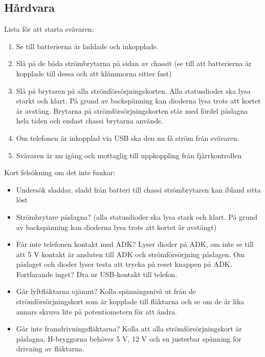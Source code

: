 \subsection{Hårdvara}

Lista för att starta svävaren:
\begin{enumerate}
\item Se till batterierna är laddade och inkopplade.
\item Slå på de båda strömbrytarna på sidan av chassit (se till att batterierna är kopplade till dessa och att klämmorna sitter fast)
\item Slå på brytaren på alla strömförsörjningskorten. Alla statusdioder ska lysa starkt och klart. På grund av backspänning kan dioderna lysa trots att kortet är avstäng. Brytarna på strömförsörjningskorten står med fördel påslagna hela tiden och endast chassi brytarna används.
\item Om telefonen är inkopplad via USB ska den nu få ström från svävaren.
\item Svävaren är nu igång och mottaglig till uppkoppling från fjärrkontrollen\\
\end{enumerate}

Kort felsökning om det inte funkar:
\begin{itemize}
\item Undersök sladdar, sladd från batteri till chassi strömbrytaren kan ibland sitta löst
\item Strömbrytare påslagna? (alla statusdioder ska lysa stark och klart. På grund av backspänning kan dioderna lysa trots att kortet är avstängt)
\item Får inte telefonen kontakt med ADK? Lyser dioder på ADK, om inte se till  att 5 V kontakt är ansluten till ADK och strömförsörjning påslagen. Om påslaget och dioder lyser testa att  trycka på reset knappen på ADK. Fortfarande inget? Dra ur USB-kontakt till telefon. 
\item Går lyftfläktarna ojämnt? Kolla spänningsnivå ut från de strömförsörjningskort som är kopplade till fläktarna och se om de är lika annars skruva lite på potentiometern för att ändra.
\item Går inte framdrivningsfläktarna? Kolla att alla strömförsörjningskort är påslagna, H-bryggorna behöver 5 V, 12 V och en justerbar spänning för drivning av fläktarna.
\end{itemize}
